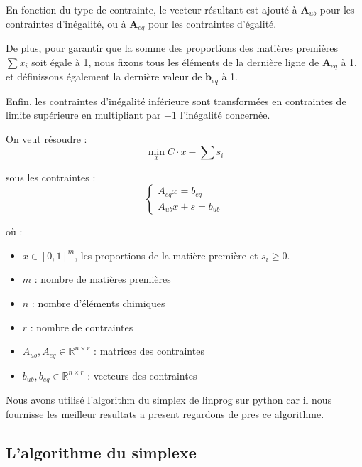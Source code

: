 \documentclass[12pt]{article}
\begin{document}
En fonction du type de contrainte, le vecteur résultant est ajouté à 
$\mathbf{A}_{ub}$ pour les contraintes d'inégalité, ou à $\mathbf{A}_{eq}$ 
pour les contraintes d'égalité.

De plus, pour garantir que la somme des proportions des matières 
premières $\sum x_i$ soit égale à 1, nous fixons tous les éléments 
de la dernière ligne de $\mathbf{A}_{eq}$ à 1, et définissons également 
la dernière valeur de $\mathbf{b}_{eq}$ à 1.

Enfin, les contraintes d'inégalité inférieure sont transformées en 
contraintes de limite supérieure en multipliant par $-1$ l'inégalité 
concernée.







On veut résoudre :
$$ \underset{x}{\min }  C \cdot x - \sum s_i $$

sous les contraintes :
$$
\begin{cases}
A_{eq} x = b_{eq} \\
A_{ub} x + s = b_{ub}
\end{cases}
$$

où :
\begin{itemize}
    \item \small $x \in [0,1]^m $, les proportions de la matière première et $ s_i \geq 0 $.
    \item \small $m$ : nombre de matières premières
    \item \small $n$ : nombre d'éléments chimiques
    \item \small $r$ : nombre de contraintes
    \item \small $A_{ub}, A_{eq} \in \mathbb{R}^{n \times r}$ : matrices des contraintes
    \item \small $b_{ub}, b_{eq} \in \mathbb{R}^{n \times r}$ : vecteurs des contraintes
\end{itemize}




Nous avons utilisé l'algorithm du simplex de linprog sur 
python  car il nous fournisse les meilleur
resultats a present regardons de pres ce algorithme.




\subsection{ L'algorithme du simplexe }
\end{document}
